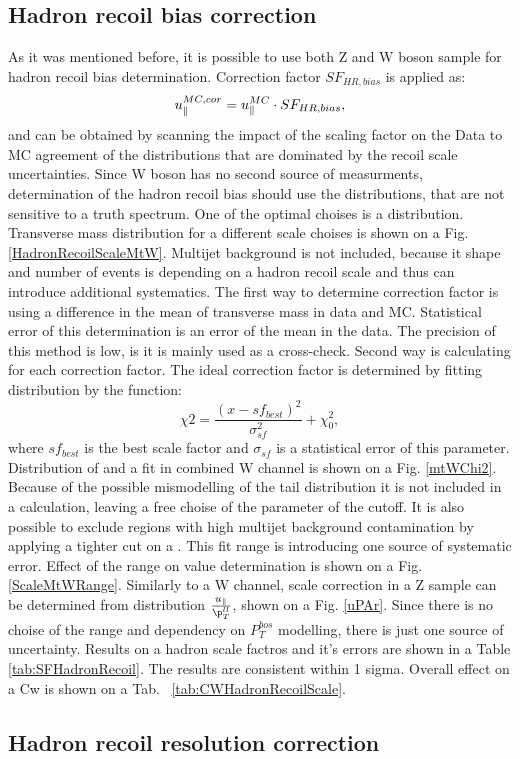 \subsection{Hadron recoil bias correction}


As it was mentioned before, it is possible to use both Z and W boson sample for hadron recoil bias determination. Correction factor $SF_{HR,bias}$ is applied as:
\begin{equation}
u_{\parallel}^{MC,cor}=u_{\parallel}^{MC} \cdot SF_{HR,bias},
\end{equation}
and can be obtained by scanning the impact of the scaling factor on the Data to MC agreement of the distributions that are dominated by the recoil scale uncertainties. Since W boson has no second source of \ptw measurments, determination of the hadron recoil bias should use the distributions, that  are not sensitive to a truth \ptw spectrum.  One of the optimal choises is a \mtw distribution. Transverse mass distribution for a different scale choises is shown on a Fig. \ref{HadronRecoilScaleMtW}. Multijet background is not included, because it shape and number of events is depending on a hadron recoil scale and thus can introduce additional systematics.
The first way to determine correction factor is using a difference in the mean of transverse mass in data and MC. Statistical error of this determination is an error of the mean in the data. The precision of this method is low, is it is mainly used as a cross-check. 
Second way is calculating  for each correction factor. The ideal correction factor is determined by fitting  distribution by the function:
\begin{equation}
\chi2 = \frac{(x-sf_{best})^2}{\sigma_{sf}^2}+\chi^2_0,
\end{equation}
where $sf_{best}$ is the best scale factor and $\sigma_{sf}$ is a statistical error of this parameter. Distribution of  and a fit in combined W channel is shown on a Fig. \ref{mtWChi2}.
Because of the possible mismodelling of the tail \mtw distribution it is not included in a  calculation, leaving a free choise of the parameter of the cutoff.  It is also possible to exclude regions with high multijet background contamination by applying a tighter cut on a \mtw. This fit range is introducing one source of systematic error. Effect of the range on value determination is shown on a Fig. \ref{ScaleMtWRange}. Similarly to a W channel, scale correction in a Z sample can be determined from distribution $\frac{\upar}{\p_T^{ll}}$, shown on a Fig. \ref{uPAr}. Since there is no choise of the range and dependency on $P_T^{bos}$ modelling, there is just one source of uncertainty.  
Results on a hadron scale factros and it's errors are shown in a Table \ref{tab:SFHadronRecoil}. The results are consistent within 1 sigma. Overall effect on a Cw is shown on a Tab. ~\ref{tab:CWHadronRecoilScale}.


\subsection{Hadron recoil resolution correction}

